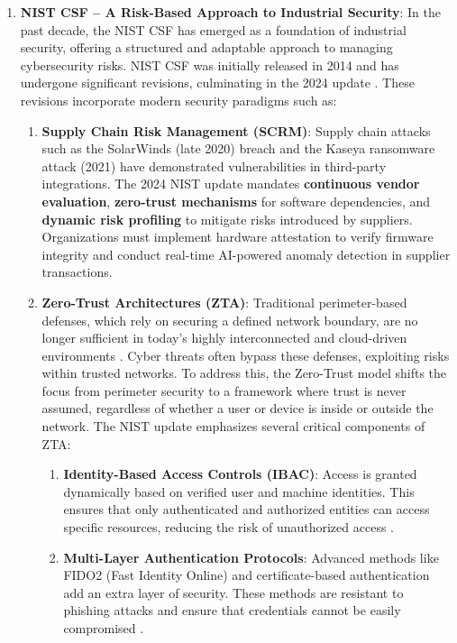 \begin{enumerate}
    \item \textbf{NIST CSF – A Risk-Based Approach to Industrial Security}: In the past decade, the NIST CSF has emerged as a foundation of industrial security, offering a structured and adaptable approach to managing cybersecurity risks. NIST CSF was initially released in 2014 and has undergone significant revisions, culminating in the 2024 update \cite{varol2024enhancing}. These revisions incorporate modern security paradigms such as:

    \begin{enumerate}
        \item \textbf{Supply Chain Risk Management (SCRM)}: Supply chain attacks such as the SolarWinds (late 2020) breach \cite{martinez2021software} and the Kaseya ransomware attack (2021) \cite{robinson2022new} have demonstrated vulnerabilities in third-party integrations. The 2024 NIST update mandates \textbf{continuous vendor evaluation}, \textbf{zero-trust mechanisms} for software dependencies, and \textbf{dynamic risk profiling} to mitigate risks introduced by suppliers. Organizations must implement hardware attestation to verify firmware integrity and conduct real-time AI-powered anomaly detection in supplier transactions.

        \item \textbf{Zero-Trust Architectures (ZTA)}: Traditional perimeter-based defenses, which rely on securing a defined network boundary, are no longer sufficient in today’s highly interconnected and cloud-driven environments \cite{damaraju2024implementing}. Cyber threats often bypass these defenses, exploiting risks within trusted networks. To address this, the Zero-Trust model shifts the focus from perimeter security to a framework where trust is never assumed, regardless of whether a user or device is inside or outside the network. The NIST update emphasizes several critical components of ZTA:
            \begin{enumerate}
               \item \textbf{Identity-Based Access Controls (IBAC)}: Access is granted dynamically based on verified user and machine identities. This ensures that only authenticated and authorized entities can access specific resources, reducing the risk of unauthorized access \cite{almuseelem2024continuous}.
        
                \item \textbf{Multi-Layer Authentication Protocols}: Advanced methods like FIDO2 (Fast Identity Online) and certificate-based authentication add an extra layer of security. These methods are resistant to phishing attacks and ensure that credentials cannot be easily compromised \cite{xun2025building}.
        

\end{enumerate}
\end{enumerate}
\end{enumerate}
